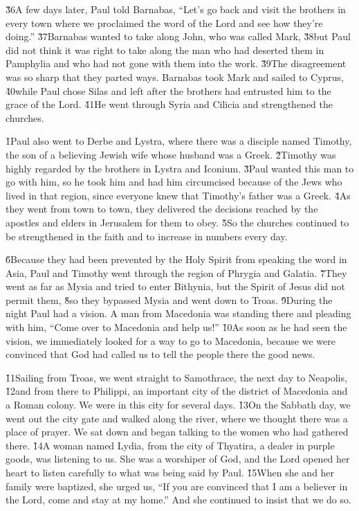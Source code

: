 \v{36}A few days later, Paul told Barnabas, ``Let's go back and visit the brothers in every town where we proclaimed the word of the Lord and see how they're doing.'' \v{37}Barnabas wanted to take along John, who was called Mark, \v{38}but Paul did not think it was right to take along the man who had deserted them in Pamphylia and who had not gone with them into the work. \v{39}The disagreement was so sharp that they parted ways. Barnabas took Mark and sailed to Cyprus, \v{40}while Paul chose Silas and left after the brothers had entrusted him to the grace of the Lord. \v{41}He went through Syria and Cilicia and strengthened the churches.

\v{1}Paul also went to Derbe and Lystra, where there was a disciple named Timothy, the son of a believing Jewish wife whose husband was a Greek. \v{2}Timothy was highly regarded by the brothers in Lystra and Iconium. \v{3}Paul wanted this man to go with him, so he took him and had him circumcised because of the Jews who lived in that region, since everyone knew that Timothy's father was a Greek. \v{4}As they went from town to town, they delivered the decisions reached by the apostles and elders in Jerusalem for them to obey. \v{5}So the churches continued to be strengthened in the faith and to increase in numbers every day.

\v{6}Because they had been prevented by the Holy Spirit from speaking the word in Asia, Paul and Timothy went through the region of Phrygia and Galatia. \v{7}They went as far as Mysia and tried to enter Bithynia, but the Spirit of Jesus did not permit them, \v{8}so they bypassed Mysia and went down to Troas. \v{9}During the night Paul had a vision. A man from Macedonia was standing there and pleading with him, ``Come over to Macedonia and help us!'' \v{10}As soon as he had seen the vision, we immediately looked for a way to go to Macedonia, because we were convinced that God had called us to tell the people there the good news.

\v{11}Sailing from Troas, we went straight to Samothrace, the next day to Neapolis, \v{12}and from there to Philippi, an important city of the district of Macedonia and a Roman colony. We were in this city for several days. \v{13}On the Sabbath day, we went out the city gate and walked along the river, where we thought there was a place of prayer. We sat down and began talking to the women who had gathered there. \v{14}A woman named Lydia, from the city of Thyatira, a dealer in purple goods, was listening to us. She was a worshiper of God, and the Lord opened her heart to listen carefully to what was being said by Paul. \v{15}When she and her family were baptized, she urged us, ``If you are convinced that I am a believer in the Lord, come and stay at my home.'' And she continued to insist that we do so.

